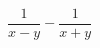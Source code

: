 \begin{ex}[type=calculate]
	\begin{condition}
		\( \dfrac{1}{x-y}-\dfrac{1}{x+y} \)
	\end{condition}
\end{ex}